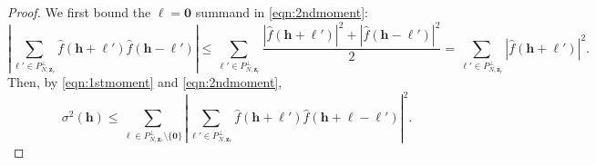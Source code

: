 \documentclass[10pt,a4paper]{amsart}
\newcommand{\abs}[1]{\left\vert#1\right\vert}
\newcommand{\bsh}{\boldsymbol{h}}
\newcommand{\bsl}{\boldsymbol{\ell}}
\newcommand{\bszero}{\boldsymbol{0}}
\begin{document}
\begin{proof}
    We first bound the $\bsl = \bszero$ summand in \eqref{eqn:2ndmoment}:
    \[
    \left|\sum_{\bsl'\in P_{N,\boldsymbol{z}_r}^\perp}\widehat{f}(\bsh+\bsl')\widehat{f}(\bsh-\bsl')\right|\leq \sum_{\bsl'\in P_{N,\boldsymbol{z}_r}^\perp}\frac{|\widehat{f}(\bsh+\bsl')|^2+|\widehat{f}(\bsh-\bsl')|^2}{2}=\sum_{\bsl' \in P_{N,\boldsymbol{z}_r}^\perp}|\widehat{f}(\bsh+\bsl')|^2.
    \]
    Then, by \eqref{eqn:1stmoment} and \eqref{eqn:2ndmoment},
    \begin{equation}\label{eqn:varbound}
        \sigma^2(\bsh)
    \leq \sum_{\bsl \in P_{N,\boldsymbol{z}_r}^\perp\setminus \{\bszero\}}\abs{\sum_{\bsl'\in P_{N,\boldsymbol{z}_r}^\perp}\widehat{f}(\bsh+\bsl')\widehat{f}(\bsh+\bsl-\bsl')}^2.
    \end{equation}
    

\end{proof}
\end{document}
